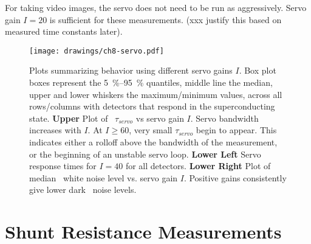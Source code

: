 For taking video images, the servo does not need to be run as aggressively. Servo gain $I = \num{20}$ is sufficient for these measurements. (xxx justify this based on measured time constants later).

\begin{figure*}
\texttt{[image: drawings/ch8-servo.pdf]}
\caption{Plots summarizing behavior using different servo gains $I$.
  Box plot boxes represent the \SIrange{5}{95}{\percent} quantiles, middle line the median, upper and lower whiskers the maximum/minimum values, across all rows/columns with detectors that respond in the superconducting state.
\textbf{Upper} Plot of \SQUID\ $\tau_{servo}$ vs servo gain $I$.
Servo bandwidth increases with $I$.
At $I \ge \num{60}$, very small $\tau_{servo}$ begin to appear. This indicates either a rolloff above the bandwidth of the measurement, or the beginning of an unstable servo loop.
\textbf{Lower Left} Servo response times for $I = 40$ for all detectors.
\textbf{Lower Right} Plot of median \SQUID\ white noise level vs. servo gain $I$. Positive gains consistently give lower dark \SQUID\ noise levels.
}
\label{fig:ch8-servo}
\end{figure*}




\section{Shunt Resistance Measurements}

